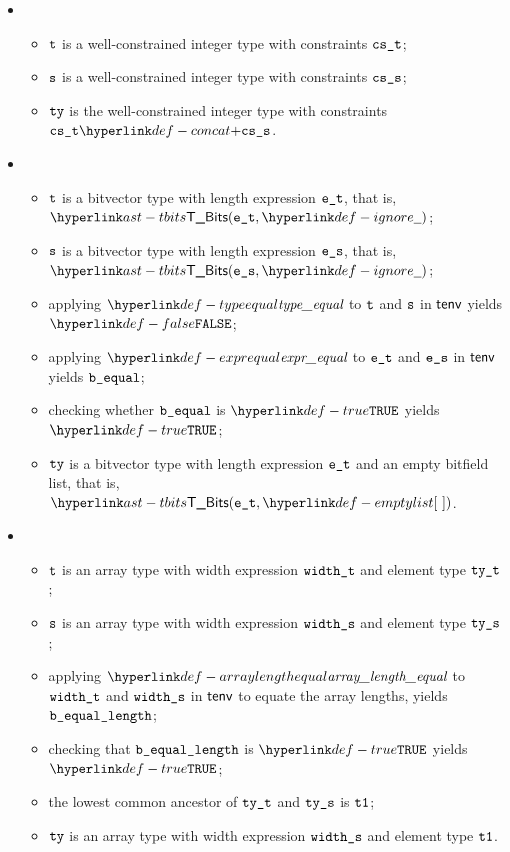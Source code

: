 \begin{itemize}
\begin{itemize}
\begin{itemize}
      \item {}
      \begin{itemize}
        \item $\texttt{t}$ is a well-constrained integer type with constraints $\texttt{cs\_t}$;
        \item $\texttt{s}$ is a well-constrained integer type with constraints $\texttt{cs\_s}$;
        \item $\texttt{ty}$ is the well-constrained integer type with constraints $\cst \concat \css$.
      \end{itemize}

      \item {}
      \begin{itemize}
        \item $\texttt{t}$ is a bitvector type with length expression $\texttt{e\_t}$, that is, $\TBits(\vet, \Ignore)$;
        \item $\texttt{s}$ is a bitvector type with length expression $\texttt{e\_s}$, that is, $\TBits(\ves, \Ignore)$;
        \item applying $\typeequal$ to $\texttt{t}$ and $\texttt{s}$ in $\textsf{tenv}$ yields $\False$;
        \item applying $\exprequal$ to $\texttt{e\_t}$ and $\texttt{e\_s}$ in $\textsf{tenv}$ yields $\texttt{b\_equal}$;
        \item checking whether $\texttt{b\_equal}$ is $\True$ yields $\True$\ProseTerminateAs{\NoLCA};
        \item $\texttt{ty}$ is a bitvector type with length expression $\texttt{e\_t}$ and an empty bitfield list, that is, $\TBits(\vet, \emptylist)$.
      \end{itemize}

      \item {}
      \begin{itemize}
        \item $\texttt{t}$ is an array type with width expression $\texttt{width\_t}$ and element type $\texttt{ty\_t}$;
        \item $\texttt{s}$ is an array type with width expression $\texttt{width\_s}$ and element type $\texttt{ty\_s}$;
        \item applying $\arraylengthequal$ to $\texttt{width\_t}$ and $\texttt{width\_s}$ in $\textsf{tenv}$ to equate the array lengths,
              yields $\texttt{b\_equal\_length}$\ProseOrTypeError;
        \item checking that $\texttt{b\_equal\_length}$ is $\True$ yields $\True$\ProseTerminateAs{\NoLCA};
        \item the lowest common ancestor of $\texttt{ty\_t}$ and $\texttt{ty\_s}$ is $\texttt{t1}$\ProseOrTypeError;
        \item $\texttt{ty}$ is an array type with width expression $\texttt{width\_s}$ and element type $\texttt{t1}$.
      \end{itemize}


\end{itemize}
\end{itemize}
\end{itemize}
